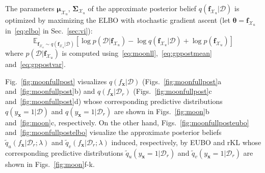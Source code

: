 \documentclass{article}
\theoremstyle{definition}
\newcommand{\mbf}[1]{\mathbf{#1}}
\newcommand{\mcl}[1]{\mathcal{#1}}
\newcommand{\mbb}[1]{\mathbb{#1}}
\newcommand{\da}{\mcl{D}}
\newcommand{\dc}{\mcl{D}_r}
\newcommand{\eubo}{\tilde{q}_u}
\newcommand{\elbo}{\tilde{q}_v}
\begin{document}
The parameters $\bm{\mu}_{\mcl{X}_u}$, $\bm{\Sigma}_{\mcl{X}_u}$ of the approximate posterior belief $q(\mbf{f}_{\mcl{X}_u}| \da)$ is optimized by maximizing the ELBO with stochastic gradient ascent (let $\bm{\theta} = \mbf{f}_{\mcl{X}_u}$ in~\eqref{eq:elbo} in Sec.~\ref{sec:vi}):
%
\begin{equation*}
\mbb{E}_{\mbf{f}_{\mcl{X}_u} \sim q(\mbf{f}_{\mcl{X}_u}| \da)} \left[ \log p(\da|\mbf{f}_{\mcl{X}_u})
- \log q(\mbf{f}_{\mcl{X}_u}| \da)
+ \log p(\mbf{f}_{\mcl{X}_u}) \right]
\end{equation*}
%
where $p(\da|\mbf{f}_{\mcl{X}_u})$ is computed using~\eqref{eq:moonll},~\eqref{eq:gppostmean} and~\eqref{eq:gppostvar}.

Fig.~\ref{fig:moonfullpost} visualizes 
$q(f_{\mbf{x}}| \da)$ (Figs.~\ref{fig:moonfullpost}a and~\ref{fig:moonfullpost}b)
and $q(f_{\mbf{x}}| \dc)$ (Figs.~\ref{fig:moonfullpost}c and~\ref{fig:moonfullpost}d) whose corresponding predictive distributions 
$q(y_{\mbf{x}}=1| \da)$ and
$q(y_{\mbf{x}}=1| \dc)$ are shown in Figs.~\ref{fig:moon}b and~\ref{fig:moon}c, respectively.
On the other hand, Figs.~\ref{fig:moonfullposteubo} and~\ref{fig:moonfullpostelbo} visualize the approximate posterior beliefs $\eubo(f_{\mbf{x}}|\dc;\lambda)$ and $\elbo(f_{\mbf{x}}|\dc;\lambda)$
induced, respectively, by EUBO 
and rKL 
whose corresponding predictive distributions $\eubo(y_{\mbf{x}}=1|\dc)$ and $\elbo(y_{\mbf{x}}=1|\dc)$ are shown in Figs.~\ref{fig:moon}f-k.
%
\end{document}
